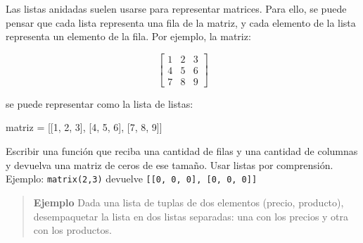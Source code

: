 \documentclass[
  letterpaper,
  DIV=11,
  numbers=noendperiod]{scrreprt}
\newenvironment{Shaded}{\begin{snugshade}}{\end{snugshade}}
\newcommand{\DecValTok}[1]{\textcolor[rgb]{0.68,0.00,0.00}{#1}}
\newcommand{\NormalTok}[1]{\textcolor[rgb]{0.00,0.23,0.31}{#1}}
\newcommand{\OperatorTok}[1]{\textcolor[rgb]{0.37,0.37,0.37}{#1}}
\begin{document}
Las listas anidadas suelen usarse para representar matrices. Para ello,
se puede pensar que cada lista representa una fila de la matriz, y cada
elemento de la lista representa un elemento de la fila. Por ejemplo, la
matriz:

\[
\begin{bmatrix}
1 & 2 & 3 \\
4 & 5 & 6 \\
7 & 8 & 9
\end{bmatrix}
\]

se puede representar como la lista de listas:

\begin{Shaded}
\begin{Highlighting}[]
\NormalTok{matriz }\OperatorTok{=}\NormalTok{ [[}\DecValTok{1}\NormalTok{, }\DecValTok{2}\NormalTok{, }\DecValTok{3}\NormalTok{], [}\DecValTok{4}\NormalTok{, }\DecValTok{5}\NormalTok{, }\DecValTok{6}\NormalTok{], [}\DecValTok{7}\NormalTok{, }\DecValTok{8}\NormalTok{, }\DecValTok{9}\NormalTok{]]}
\end{Highlighting}
\end{Shaded}

\begin{tcolorbox}[enhanced jigsaw, colframe=quarto-callout-important-color-frame, opacityback=0, opacitybacktitle=0.6, bottomrule=.15mm, toprule=.15mm, coltitle=black, breakable, colback=white, leftrule=.75mm, titlerule=0mm, bottomtitle=1mm, toptitle=1mm, rightrule=.15mm, title=\textcolor{quarto-callout-important-color}{\faExclamation}\hspace{0.5em}{Ejercicio Desafío}, arc=.35mm, left=2mm, colbacktitle=quarto-callout-important-color!10!white]

Escribir una función que reciba una cantidad de filas y una cantidad de
columnas y devuelva una matriz de ceros de ese tamaño. Usar listas por
comprensión.\\
Ejemplo: \texttt{matrix(2,3)} devuelve
\texttt{{[}{[}0,\ 0,\ 0{]},\ {[}0,\ 0,\ 0{]}{]}}

\end{tcolorbox}

\hfill\break

\begin{quote}
\textbf{Ejemplo} Dada una lista de tuplas de dos elementos (precio,
producto), desempaquetar la lista en dos listas separadas: una con los
precios y otra con los productos.
\end{quote}
\end{document}

